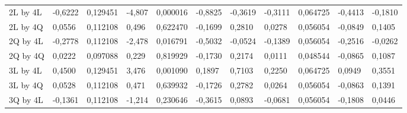 \begin{table}[H]
{\begin{tabular}{lllllllllll}
\rowcolor[HTML]{FFFFFF} 
2L by 4L       & {\color[HTML]{FF0000} -0,6222}  & {\color[HTML]{FF0000} 0,129451} & {\color[HTML]{FF0000} -4,807}   & {\color[HTML]{FF0000} 0,000016} & {\color[HTML]{FF0000} -0,8825}  & {\color[HTML]{FF0000} -0,3619}  & {\color[HTML]{FF0000} -0,3111}  & {\color[HTML]{FF0000} 0,064725} & {\color[HTML]{FF0000} -0,4413}  & {\color[HTML]{FF0000} -0,1810}  \\
\rowcolor[HTML]{FFFFFF} 
2L by 4Q       & 0,0556                          & 0,112108                        & 0,496                           & 0,622470                        & -0,1699                         & 0,2810                          & 0,0278                          & 0,056054                        & -0,0849                         & 0,1405                          \\
\rowcolor[HTML]{FFFFFF} 
2Q by 4L       & {\color[HTML]{FF0000} -0,2778}  & {\color[HTML]{FF0000} 0,112108} & {\color[HTML]{FF0000} -2,478}   & {\color[HTML]{FF0000} 0,016791} & {\color[HTML]{FF0000} -0,5032}  & {\color[HTML]{FF0000} -0,0524}  & {\color[HTML]{FF0000} -0,1389}  & {\color[HTML]{FF0000} 0,056054} & {\color[HTML]{FF0000} -0,2516}  & {\color[HTML]{FF0000} -0,0262}  \\
\rowcolor[HTML]{FFFFFF} 
2Q by 4Q       & 0,0222                          & 0,097088                        & 0,229                           & 0,819929                        & -0,1730                         & 0,2174                          & 0,0111                          & 0,048544                        & -0,0865                         & 0,1087                          \\
\rowcolor[HTML]{FFFFFF} 
3L by 4L       & {\color[HTML]{FF0000} 0,4500}   & {\color[HTML]{FF0000} 0,129451} & {\color[HTML]{FF0000} 3,476}    & {\color[HTML]{FF0000} 0,001090} & {\color[HTML]{FF0000} 0,1897}   & {\color[HTML]{FF0000} 0,7103}   & {\color[HTML]{FF0000} 0,2250}   & {\color[HTML]{FF0000} 0,064725} & {\color[HTML]{FF0000} 0,0949}   & {\color[HTML]{FF0000} 0,3551}   \\
\rowcolor[HTML]{FFFFFF} 
3L by 4Q       & 0,0528                          & 0,112108                        & 0,471                           & 0,639932                        & -0,1726                         & 0,2782                          & 0,0264                          & 0,056054                        & -0,0863                         & 0,1391                          \\
\rowcolor[HTML]{FFFFFF} 
3Q by 4L       & -0,1361                         & 0,112108                        & -1,214                          & 0,230646                        & -0,3615                         & 0,0893                          & -0,0681                         & 0,056054                        & -0,1808                         & 0,0446                          \\

\end{tabular}}
\end{table}
